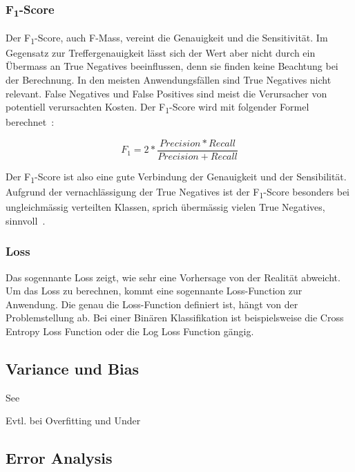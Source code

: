 \subsubsection{F\textsubscript{1}-Score}

Der F\textsubscript{1}-Score, auch F-Mass, vereint die Genauigkeit und die Sensitivität. Im Gegensatz zur Treffergenauigkeit lässt sich der Wert aber nicht durch ein Übermass an True Negatives beeinflussen, denn sie finden keine Beachtung bei der Berechnung. In den meisten Anwendungsfällen sind True Negatives nicht relevant. False Negatives und False Positives sind meist die Verursacher von potentiell verursachten Kosten. Der F\textsubscript{1}-Score wird mit folgender Formel berechnet~\autocite{TDSAccuracy}:

$$F_1=2 * \frac{Precision * Recall}{Precision + Recall}$$

Der F\textsubscript{1}-Score ist also eine gute Verbindung der Genauigkeit und der Sensibilität. Aufgrund der vernachlässigung der True Negatives ist der F\textsubscript{1}-Score besonders bei ungleichmässig verteilten Klassen, sprich übermässig vielen True Negatives, sinnvoll~\autocite{TDSAccuracy}.

\subsubsection{Loss}


Das sogennante Loss zeigt, wie sehr eine Vorhersage von der Realität abweicht. Um das Loss zu berechnen, kommt eine sogennante Loss-Function zur Anwendung. Die genau die Loss-Function definiert ist, hängt von der Problemstellung ab. Bei einer Binären Klassifikation ist beispielsweise die Cross Entropy Loss Function oder die Log Loss Function gängig. 


\subsection{Variance und Bias}

See \textcite{MLYearning}

Evtl. bei Overfitting und Under

\subsection{Error Analysis}


